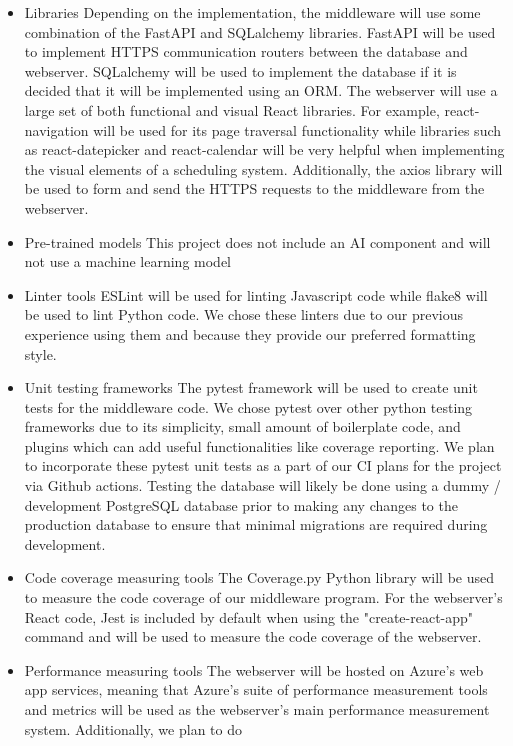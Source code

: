 \documentclass{article}
\begin{document}
\begin{itemize}
\item Libraries
\subitem Depending on the implementation, the middleware will use some combination
of the FastAPI and SQLalchemy libraries. FastAPI will be used to implement HTTPS 
communication routers between the database and webserver. SQLalchemy will be used to 
implement the database if it is decided that it will be implemented using an ORM.
\subitem The webserver will use a large set of both functional and visual React
libraries. For example, react-navigation will be used for its page traversal 
functionality while libraries such as react-datepicker and react-calendar will 
be very helpful when implementing the visual elements of a scheduling system. 
Additionally, the axios library will be used to form and send the HTTPS requests 
to the middleware from the webserver.
\item Pre-trained models
\subitem This project does not include an AI component and will not use 
a machine learning model
\item Linter tools
\subitem ESLint will be used for linting Javascript code while flake8 will be 
used to lint Python code. We chose these linters due to our previous experience 
using them and because they provide our preferred formatting style.
\item Unit testing frameworks
\subitem The pytest framework will be used to create unit tests for the middleware
code. We chose pytest over other python testing frameworks due to its simplicity, 
small amount of boilerplate code, and plugins which can add useful functionalities
like coverage reporting. We plan to incorporate these pytest unit tests as a part
of our CI plans for the project via Github actions.
\subitem Testing the database will likely be done using a dummy / development 
PostgreSQL database prior to making any changes to the production database to 
ensure that minimal migrations are required during development.
\item Code coverage measuring tools
\subitem The Coverage.py Python library will be used to measure the code coverage
of our middleware program. For the webserver's React code, Jest is included by 
default when using the "create-react-app" command and will be used to measure 
the code coverage of the webserver.
\item Performance measuring tools
\subitem The webserver will be hosted on Azure's web app services, meaning that
Azure's suite of performance measurement tools and metrics will be used as the 
webserver's main performance measurement system. Additionally, we plan to do

\end{itemize}
\end{document}
